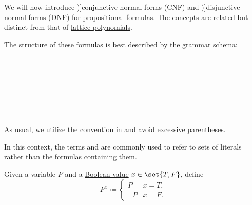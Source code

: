 \begin{definition}\label{def:cnf_and_dnf}
  We will now introduce \term[ru=конъюнктивная нормальная форма, en=conjunctive normal form (\cite[sec. 2.3.2]{Savage1998})]{conjunctive normal forms} (CNF) and \term[ru=дизъюнктивная нормальная форма, en=disjunctive normal form (\cite[sec. 2.3.1]{Savage1998})]{disjunctive normal forms} (DNF) for propositional formulas. The concepts are related but distinct from that of \hyperref[rem:lattice_polynomials]{lattice polynomials}.

  \begin{thmenum}
     The structure of these formulas is best described by the \hyperref[rem:backus_normal_form]{grammar schema}:
    \begin{bnf*}
           {} \\
           {\neg {}} \\
                    { \bnfor {}} \\
                   { \bnfor \bnftsq{(} \bnfsp {}  \bnfsp \bnftsq{\( \vee \)}   \bnfsp {} \bnfsp \bnftsq{)}} \\
                        {     \bnfor \bnftsq{(} \bnfsp {} \bnfsp \bnftsq{\( \wedge \)} \bnfsp {}      \bnfsp \bnftsq{)}} \\
                   { \bnfor \bnftsq{(} \bnfsp {}  \bnfsp \bnftsq{\( \wedge \)} \bnfsp {} \bnfsp \bnftsq{)}} \\
                        {     \bnfor \bnftsq{(} \bnfsp {} \bnfsp \bnftsq{\( \vee \)}   \bnfsp {}      \bnfsp \bnftsq{)}}
    \end{bnf*}

    As usual, we utilize the convention in  and avoid excessive parentheses.

    In this context, the terms  and  are commonly used to refer to sets of literals rather than the formulas containing them.

     Given a variable \( P \) and a \hyperref[def:boolean_value]{Boolean value} \( x \in \set{ T, F } \), define
    \begin{equation*}
      P^x \coloneqq \begin{cases}
        P      &x = T, \\
        \neg P &x = F.
      \end{cases}
    \end{equation*}


\end{thmenum}
\end{definition}
